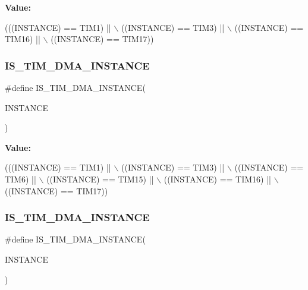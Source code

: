 {\bfseries Value\+:}
\begin{DoxyCode}
(((INSTANCE) == TIM1)    || \(\backslash\)
   ((INSTANCE) == TIM3)    || \(\backslash\)
   ((INSTANCE) == TIM16)   || \(\backslash\)
   ((INSTANCE) == TIM17))
\end{DoxyCode}
\mbox{\label{group___exported__macro_gad51d77b3bcc12a3a5c308d727b561371}} 
\subsubsection{\texorpdfstring{I\+S\+\_\+\+T\+I\+M\+\_\+\+D\+M\+A\+\_\+\+I\+N\+S\+T\+A\+N\+CE}{IS\_TIM\_DMA\_INSTANCE}\hspace{0.1cm}{\footnotesize\ttfamily [2/16]}}
{\footnotesize\ttfamily \#define I\+S\+\_\+\+T\+I\+M\+\_\+\+D\+M\+A\+\_\+\+I\+N\+S\+T\+A\+N\+CE(\begin{DoxyParamCaption}\item[{}]{I\+N\+S\+T\+A\+N\+CE }\end{DoxyParamCaption})}

{\bfseries Value\+:}
\begin{DoxyCode}
(((INSTANCE) == TIM1)    || \(\backslash\)
   ((INSTANCE) == TIM3)    || \(\backslash\)
   ((INSTANCE) == TIM6)    || \(\backslash\)
   ((INSTANCE) == TIM15)   || \(\backslash\)
   ((INSTANCE) == TIM16)   || \(\backslash\)
   ((INSTANCE) == TIM17))
\end{DoxyCode}
\mbox{\label{group___exported__macro_gad51d77b3bcc12a3a5c308d727b561371}} 
\subsubsection{\texorpdfstring{I\+S\+\_\+\+T\+I\+M\+\_\+\+D\+M\+A\+\_\+\+I\+N\+S\+T\+A\+N\+CE}{IS\_TIM\_DMA\_INSTANCE}\hspace{0.1cm}{\footnotesize\ttfamily [3/16]}}
{\footnotesize\ttfamily \#define I\+S\+\_\+\+T\+I\+M\+\_\+\+D\+M\+A\+\_\+\+I\+N\+S\+T\+A\+N\+CE(\begin{DoxyParamCaption}\item[{}]{I\+N\+S\+T\+A\+N\+CE }\end{DoxyParamCaption})}


